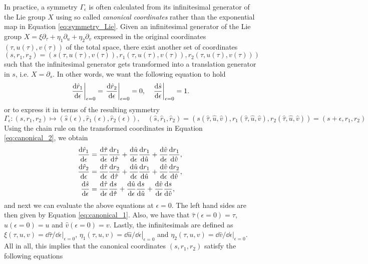 In practice, a symmetry $\Gamma_\epsilon$ is often calculated from its infinitesimal generator of the Lie group $X$ using so called \textit{canonical coordinates} rather than the exponential map in Equation \eqref{eq:symmetry_Lie}. Given an infinitesimal generator of the Lie group $X=\xi\partial_\tau+\eta_1\partial_u+\eta_2\partial_v$ expressed in the original coordinates $(\tau,u(\tau),v(\tau))$ of the total space, there exist another set of coordinates $(s,r_1,r_2)=(s(\tau,u(\tau),v(\tau)),r_1(\tau,u(\tau),v(\tau)),r_2(\tau,u(\tau),v(\tau)))$ such that the infinitesimal generator gets transformed into a translation generator in $s$, i.e. $X=\partial_s$. In other words, we want the following equation to hold
\begin{equation}
  \left.\dv{\hat{r}_1}{\epsilon}\right|_{\epsilon=0}=  \left.\dv{\hat{r}_2}{\epsilon}\right|_{\epsilon=0}=0,\quad  \left.\dv{\hat{s}}{\epsilon}\right|_{\epsilon=0}=1.
  \label{eq:canonical_1}
  \end{equation}
  or to express it in terms of the resulting symmetry
\begin{equation}
  \Gamma_{\epsilon}:(s,r_1,r_2)\mapsto(\hat{s}(\epsilon),\hat{r}_1(\epsilon),\hat{r}_2(\epsilon)),\quad(\hat{s},\hat{r}_1,\hat{r}_2)=(s(\hat{\tau},\hat{u},\hat{v}),r_1(\hat{\tau},\hat{u},\hat{v}),r_2(\hat{\tau},\hat{u},\hat{v}))=(s+\epsilon,r_1,r_2)
  \label{eq:canonical_2}
  \end{equation}  
  Using the chain rule on the transformed coordinates in Equation \eqref{eq:canonical_2}, we obtain
  \begin{align*}
    \dv{\hat{r}_1}{\epsilon}&=\dv{\hat{\tau}}{\epsilon}\dv{r_1}{\hat{\tau}}+\dv{\hat{u}}{\epsilon}\dv{r_1}{\hat{u}}+\dv{\hat{v}}{\epsilon}\dv{r_1}{\hat{v}},\\
    \dv{\hat{r}_2}{\epsilon}&=\dv{\hat{\tau}}{\epsilon}\dv{r_2}{\hat{\tau}}+\dv{\hat{u}}{\epsilon}\dv{r_1}{\hat{u}}+\dv{\hat{v}}{\epsilon}\dv{r_2}{\hat{v}},\\
    \dv{\hat{s}}{\epsilon}&=\dv{\hat{\tau}}{\epsilon}\dv{s}{\hat{\tau}}+\dv{\hat{u}}{\epsilon}\dv{s}{\hat{u}}+\dv{\hat{v}}{\epsilon}\dv{s}{\hat{v}},\\
  \end{align*}
  and next we can evaluate the above equations at $\epsilon=0$. The left hand sides are then given by Equation \eqref{eq:canonical_1}. Also, we have that $\hat{\tau}(\epsilon=0)=\tau$, $\hat{u}(\epsilon=0)=u$ and $\hat{v}(\epsilon=0)=v$. Lastly, the infinitesimals are defined as $\xi(\tau,u,v)=\left.\dd\hat{\tau}/\dd\epsilon\right|_{\epsilon=0}$, $\eta_1(\tau,u,v)=\left.\dd\hat{u}/\dd\epsilon\right|_{\epsilon=0}$ and $\eta_2(\tau,u,v)=\left.\dd\hat{v}/\dd\epsilon\right|_{\epsilon=0}$. All in all, this implies that the canonical coordinates $(s,r_1,r_2)$ satisfy the following equations

